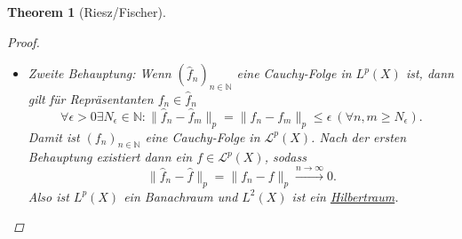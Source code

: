 \documentclass[a4paper]{report}
\newcommand{\N}{\mathbb{N}}
\newcommand{\Leb}{\mathcal{L}}
\newcommand{\jhyperref}[2]{\hyperref[j_#1]{#2}}
\newcommand{\jlink}[1]{\jhyperref{#1}{#1}}
\theoremstyle{plain}
\newtheorem{thm}{Theorem}[chapter]
\theoremstyle{definition}
\begin{document}
{{{{\begin{thm}[Riesz/Fischer]
    \begin{proof}
        \begin{itemize}
            \item[1)]
                Zweite Behauptung: Wenn $(\hat{f}_n)_{n\in\N}$ eine Cauchy-Folge in $L^p(X)$ ist, dann gilt für Repräsentanten $f_n\in \hat{f}_n$
                \[
                    \forall \epsilon > 0 \exists N_\epsilon \in \N: \lVert \hat{f}_n - \hat{f}_m \rVert_p = \lVert f_n - f_m \rVert_p \le \epsilon\ (\forall n,m\ge N_\epsilon).
                \]
                Damit ist $(f_n)_{n\in\N}$ eine Cauchy-Folge in $\Leb^p(X)$. Nach der ersten Behauptung existiert dann ein $f\in\Leb^p(X)$, sodass
                \[
                    \lVert \hat{f}_n - \hat{f} \rVert_p = \lVert f_n - f \rVert_p \xrightarrow{n\to \infty} 0.
                \]
                Also ist $L^p(X)$ ein Banachraum und $L^2(X)$ ist ein \jlink{Hilbertraum}.
                

\end{itemize}
\end{proof}
\end{thm}}}}}
\end{document}

